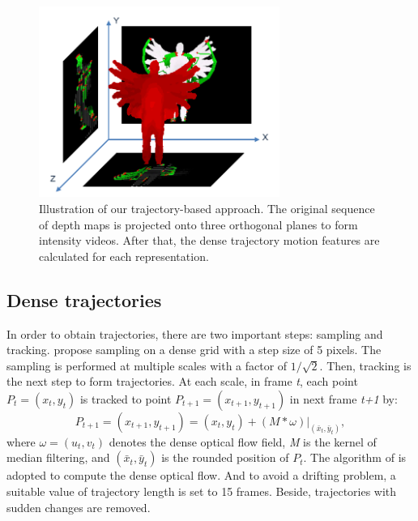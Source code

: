 \documentclass[review]{elsarticle}
\begin{document}
\begin{figure}
	\begin{center}
		\includegraphics[width=0.7\textwidth]{Projections.png}
	\end{center}
	\caption{\label{lbl:Figure_ProposedMethod}Illustration of our trajectory-based approach. The original sequence of depth maps is projected onto three orthogonal planes to form intensity videos. After that, the dense trajectory motion features are calculated for each representation.}
\end{figure}


\subsection{Dense trajectories}
In order to obtain trajectories, there are two important steps: sampling and tracking. \cite{wang2011densetraj} propose sampling on a dense grid with a step size of 5 pixels. The sampling is performed at multiple scales with a factor of $1/\sqrt{2}$. Then, tracking is the next step to form trajectories. At each scale, in frame \textit{t}, each point \textit{$P_t = (x_t, y_t)$} is tracked to point \textit{$P_{t+1} = (x_{t+1}, y_{t+1})$} in next frame \textit{t+1} by:
\begin{equation}
	\textit{$P_{t+1} = (x_{t+1}, y_{t+1}) = (x_t, y_t) + (M*\omega)|_{(\bar{x}_t,\bar{y}_t)} $},
\end{equation}
where \textit{$\omega = (u_t, v_t)$} denotes the dense optical flow field, \textit{M} is the kernel of median filtering, and \textit{$(\bar{x}_t,\bar{y}_t)$} is the rounded position of \textit{$P_t$}. The algorithm of \cite{farneback2003two} is adopted to compute the dense optical flow. And to avoid a drifting problem, a suitable value of trajectory length is set to 15 frames. Beside, trajectories with sudden changes are removed.
\end{document}
